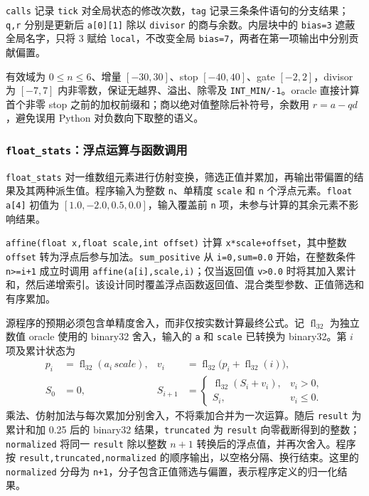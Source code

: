 \texttt{calls} 记录 \texttt{tick} 对全局状态的修改次数，\texttt{tag} 记录三条条件语句的分支结果；\texttt{q,r} 分别是更新后 \texttt{a[0][1]} 除以 \texttt{divisor} 的商与余数。内层块中的 \texttt{bias=3} 遮蔽全局名字，只将 3 赋给 \texttt{local}，不改变全局 \texttt{bias=7}，两者在第一项输出中分别贡献偏置。

有效域为 $0\le n\le6$、增量 $[-30,30]$、stop $[-40,40]$、gate $[-2,2]$，divisor 为 $[-7,7]$ 内非零数，保证无越界、溢出、除零及 \texttt{INT\_MIN/-1}。oracle 直接计算首个非零 stop 之前的加权前缀和；商以绝对值整除后补符号，余数用 $r=a-qd$，避免误用 Python 对负数向下取整的语义。

\subsubsection{\texttt{float\_stats}：浮点运算与函数调用}
\label{sec:sysy-float-semantics}
\texttt{float\_stats} 对一维数组元素进行仿射变换，筛选正值并累加，再输出带偏置的结果及其两种派生值。程序输入为整数 \texttt{n}、单精度 \texttt{scale} 和 \texttt{n} 个浮点元素。\texttt{float a[4]} 初值为 $[1.0,-2.0,0.5,0.0]$，输入覆盖前 \texttt{n} 项，未参与计算的其余元素不影响结果。

\texttt{affine(float x,float scale,int offset)} 计算 \texttt{x*scale+offset}，其中整数 \texttt{offset} 转为浮点后参与加法。\texttt{sum\_positive} 从 \texttt{i=0,sum=0.0} 开始，在整数条件 \texttt{n>=i+1} 成立时调用 \texttt{affine(a[i],scale,i)}；仅当返回值 \texttt{v>0.0} 时将其加入累计和，然后递增索引。该设计同时覆盖浮点函数返回值、混合类型参数、正值筛选和有序累加。

源程序的预期必须包含单精度舍入，而非仅按实数计算最终公式。记 $\operatorname{fl}_{32}$ 为独立数值 oracle 使用的 binary32 舍入，输入的 \texttt{a} 和 \texttt{scale} 已转换为 binary32。第 $i$ 项及累计状态为
\begin{equation}
\begin{aligned}
p_i&=\operatorname{fl}_{32}(a_i\,scale),&
v_i&=\operatorname{fl}_{32}\bigl(p_i+\operatorname{fl}_{32}(i)\bigr),\\
S_0&=0,&
S_{i+1}&=
\begin{cases}
\operatorname{fl}_{32}(S_i+v_i),&v_i>0,\\
S_i,&v_i\le0.
\end{cases}
\end{aligned}
\label{eq:sysy-float-oracle}
\end{equation}
乘法、仿射加法与每次累加分别舍入，不将乘加合并为一次运算。随后 \texttt{result} 为累计和加 0.25 后的 binary32 结果，\texttt{truncated} 为 \texttt{result} 向零截断得到的整数；\texttt{normalized} 将同一 \texttt{result} 除以整数 $n+1$ 转换后的浮点值，并再次舍入。程序按 \texttt{result,truncated,normalized} 的顺序输出，以空格分隔、换行结束。这里的 \texttt{normalized} 分母为 \texttt{n+1}，分子包含正值筛选与偏置，表示程序定义的归一化结果。

